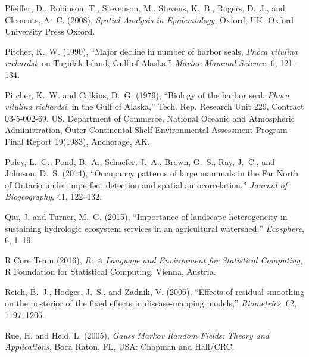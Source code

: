 \documentclass[11pt, titlepage]{article}\usepackage[]{graphicx}\usepackage[]{color}
\begin{document}
\begin{spacing}{1.9}
\begin{flushleft}
\begin{thebibliography}{126}
Pfeiffer, D., Robinson, T., Stevenson, M., Stevens, K.~B., Rogers, D.~J., and
  Clements, A.~C. (2008), \textit{Spatial Analysis in Epidemiology}, Oxford,
  UK: Oxford University Press Oxford.

Pitcher, K.~W. (1990), \enquote{Major decline in number of harbor seals,
  \emph{Phoca vitulina richardsi}, on {T}ugidak {I}sland, {G}ulf of {A}laska,}
  \textit{Marine Mammal Science}, 6, 121--134.

Pitcher, K.~W. and Calkins, D.~G. (1979), \enquote{Biology of the harbor seal,
  \emph{Phoca vitulina richardsi}, in the {G}ulf of {A}laska,} Tech. Rep.
  Research Unit 229, Contract 03-5-002-69, US. Department of Commerce, National
  Oceanic and Atmospheric Administration, Outer Continental Shelf Environmental
  Assessment Program Final Report 19(1983), Anchorage, AK.

Poley, L.~G., Pond, B.~A., Schaefer, J.~A., Brown, G.~S., Ray, J.~C., and
  Johnson, D.~S. (2014), \enquote{Occupancy patterns of large mammals in the
  Far North of Ontario under imperfect detection and spatial autocorrelation,}
  \textit{Journal of Biogeography}, 41, 122--132.

Qiu, J. and Turner, M.~G. (2015), \enquote{Importance of landscape
  heterogeneity in sustaining hydrologic ecosystem services in an agricultural
  watershed,} \textit{Ecosphere}, 6, 1--19.

{R Core Team} (2016), \textit{R: A Language and Environment for Statistical
  Computing}, R Foundation for Statistical Computing, Vienna, Austria.

Reich, B.~J., Hodges, J.~S., and Zadnik, V. (2006), \enquote{Effects of
  residual smoothing on the posterior of the fixed effects in disease-mapping
  models,} \textit{Biometrics}, 62, 1197--1206.

Rue, H. and Held, L. (2005), \textit{Gauss Markov Random Fields: Theory and
  Applications}, Boca Raton, FL, USA: Chapman and Hall/CRC.


\end{thebibliography}
\end{flushleft}
\end{spacing}
\end{document}
